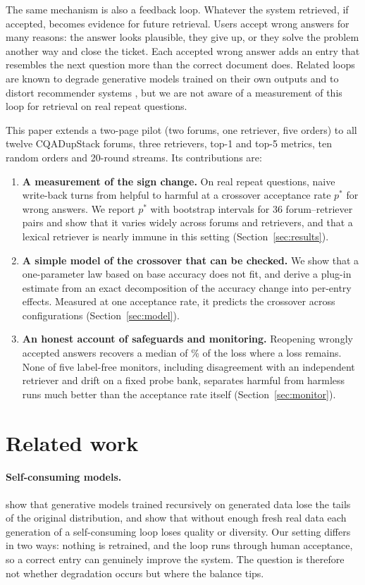 \documentclass[11pt]{article}
\begin{document}
The same mechanism is also a feedback loop. Whatever the system retrieved, if accepted, becomes evidence for future retrieval. Users accept wrong answers for many reasons: the answer looks plausible, they give up, or they solve the problem another way and close the ticket. Each accepted wrong answer adds an entry that resembles the next question more than the correct document does. Related loops are known to degrade generative models trained on their own outputs \citep{shumailov2024collapse,alemohammad2024mad} and to distort recommender systems \citep{chaney2018confounding}, but we are not aware of a measurement of this loop for retrieval on real repeat questions.

This paper extends a two-page pilot (two forums, one retriever, five orders) to all twelve CQADupStack forums, three retrievers, top-1 and top-5 metrics, ten random orders and 20-round streams. Its contributions are:
\begin{enumerate}
\item \textbf{A measurement of the sign change.} On real repeat questions, naive write-back turns from helpful to harmful at a crossover acceptance rate $p^*$ for wrong answers. We report $p^*$ with bootstrap intervals for 36 forum--retriever pairs and show that it varies widely across forums and retrievers, and that a lexical retriever is nearly immune in this setting (Section~\ref{sec:results}).
\item \textbf{A simple model of the crossover that can be checked.} We show that a one-parameter law based on base accuracy does not fit, and derive a plug-in estimate from an exact decomposition of the accuracy change into per-entry effects. Measured at one acceptance rate, it predicts the crossover across configurations (Section~\ref{sec:model}).
\item \textbf{An honest account of safeguards and monitoring.} Reopening wrongly accepted answers recovers a median of \recMedStill\% of the loss where a loss remains. None of five label-free monitors, including disagreement with an independent retriever and drift on a fixed probe bank, separates harmful from harmless runs much better than the acceptance rate itself (Section~\ref{sec:monitor}).
\end{enumerate}

\section{Related work}
\paragraph{Self-consuming models.} \citet{shumailov2024collapse} show that generative models trained recursively on generated data lose the tails of the original distribution, and \citet{alemohammad2024mad} show that without enough fresh real data each generation of a self-consuming loop loses quality or diversity. Our setting differs in two ways: nothing is retrained, and the loop runs through human acceptance, so a correct entry can genuinely improve the system. The question is therefore not whether degradation occurs but where the balance tips.
\end{document}
